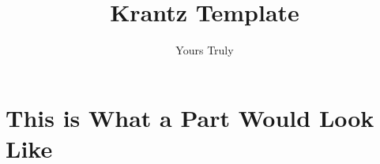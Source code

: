 \documentclass[krantz1,ChapterTOCs]{krantz} %
\begin{document}
\frontmatter

\title{Krantz Template} %
\author{Yours Truly}


\halftitle

\booktitle

\locpage


\cleardoublepage
\setcounter{page}{7} %
\tableofcontents
% 
% 
% 
% 

\mainmatter

\part{This is What a Part Would Look Like}






\printindex
\cleardoublepage
\end{document}
